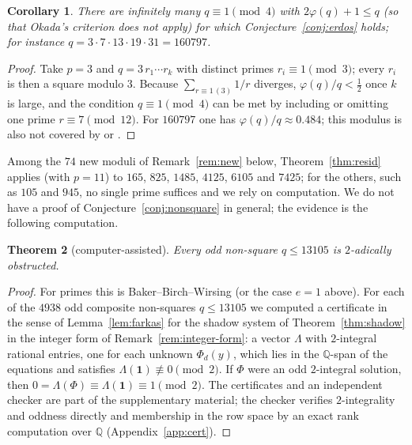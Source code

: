 \documentclass[11pt]{amsart}
\newtheorem{theorem}{Theorem}[section]
\newtheorem{corollary}[theorem]{Corollary}
\theoremstyle{definition}
\theoremstyle{remark}
\providecommand{\Q}{\mathbb Q}
\numberwithin{equation}{section}
\begin{document}
\begin{corollary}\label{cor:resid}
There are infinitely many $q\equiv1\pmod4$ with $2\varphi(q)+1\le q$ (so that Okada's criterion does not apply) for which Conjecture~\ref{conj:erdos} holds; for instance $q=3\cdot7\cdot13\cdot19\cdot31=160797$.
\end{corollary}

\begin{proof}
Take $p=3$ and $q=3\,r_1\cdots r_k$ with distinct primes $r_i\equiv1\pmod 3$; every $r_i$ is then a square modulo $3$.
Because $\sum_{r\equiv1\,(3)}1/r$ diverges, $\varphi(q)/q<\frac12$ once $k$ is large, and the condition $q\equiv1\pmod4$ can be met by including or omitting one prime $r\equiv7\pmod{12}$.
For $160797$ one has $\varphi(q)/q\approx0.484$; this modulus is also not covered by \cite[Prop.~3.1, Cor.~3.3]{CM15} or \cite[Cor.~1]{Bha22}.
\end{proof}

Among the $74$ new moduli of Remark~\ref{rem:new} below, Theorem~\ref{thm:resid} applies (with $p=11$) to $165$, $825$, $1485$, $4125$, $6105$ and $7425$; for the others, such as $105$ and $945$, no single prime suffices and we rely on computation.
We do not have a proof of Conjecture~\ref{conj:nonsquare} in general; the evidence is the following computation.

\begin{theorem}[computer-assisted]\label{thm:nonsquares}
Every odd non-square $q\le 13105$ is $2$-adically obstructed.
\end{theorem}

\begin{proof}
For primes this is Baker--Birch--Wirsing (or the case $e=1$ above).
For each of the $4938$ odd composite non-squares $q\le13105$ we computed a certificate in the sense of Lemma~\ref{lem:farkas} for the shadow system of Theorem~\ref{thm:shadow} in the integer form of Remark~\ref{rem:integer-form}: a vector $\Lambda$ with $2$-integral rational entries, one for each unknown $\Phi_d(y)$, which lies in the $\Q$-span of the equations and satisfies $\Lambda(\mathbf1)\not\equiv0\pmod 2$.
If $\Phi$ were an odd $2$-integral solution, then $0=\Lambda(\Phi)\equiv\Lambda(\mathbf1)\equiv1\pmod2$.
The certificates and an independent checker are part of the supplementary material; the checker verifies $2$-integrality and oddness directly and membership in the row space by an exact rank computation over $\Q$ (Appendix~\ref{app:cert}).
\end{proof}
\end{document}
